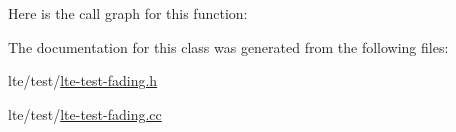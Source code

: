 Here is the call graph for this function\+:




The documentation for this class was generated from the following files\+:\begin{DoxyCompactItemize}
\item 
lte/test/\hyperlink{lte-test-fading_8h}{lte-\/test-\/fading.\+h}\item 
lte/test/\hyperlink{lte-test-fading_8cc}{lte-\/test-\/fading.\+cc}\end{DoxyCompactItemize}
